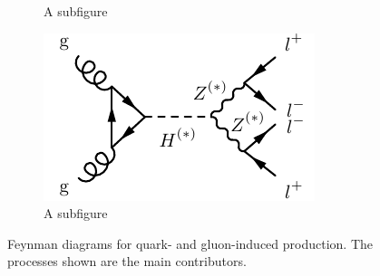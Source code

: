 \begin{figure}
\begin{subfigure}{.24\textwidth}
  \caption{A subfigure}
  \label{fig:m4lfeynman:ggZZ}
\end{subfigure}
\begin{subfigure}{.24\textwidth}
  \centering
  \includegraphics[width=.99\textwidth]{Figures/FeynGraphs/ggZZ4lhiggs.pdf}
  \caption{A subfigure}
  \label{fig:m4lfeynman:ggHZZ}
\end{subfigure}
\caption{Feynman diagrams for quark- and gluon-induced \ZZ production. The processes shown are the main contributors.}
\label{fig:m4lfeynman}
\end{figure}

